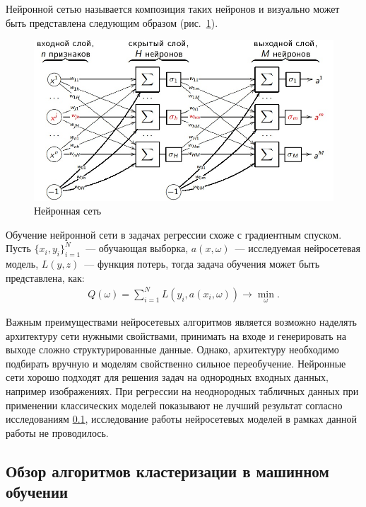 \documentclass[12pt,a4paper]{article} %
\begin{document}
Нейронной сетью называется композиция таких нейронов и визуально может быть представлена следующим образом (рис.~\ref{fig:neyron_net}).
\begin{figure}[h]
	
	\centering
	
	\includegraphics[width=0.8\linewidth]{neyron_net.jpg}
	
	\caption{Нейронная сеть}
	
	\label{fig:neyron_net}
	
\end{figure}

Обучение нейронной сети в задачах регрессии схоже с градиентным спуском. Пусть $\{x_i, y_i\}_{i=1}^{N}$~--- обучающая выборка, $a(x,\omega)$~--- исследуемая нейросетевая модель, $L(y,z)$~--- функция потерь, тогда задача обучения может быть представлена, как:
\begin{gather}\label{ney2}
	Q(\omega) = \sum\limits_{i=1}^{N}L(y_i, a(x_i, \omega)) \rightarrow \min_{\omega}.
\end{gather}

Важным преимуществами нейросетевых алгоритмов является возможно наделять архитектуру сети нужными свойствами, принимать на входе и генерировать на выходе сложно структурированные данные. Однако, архитектуру необходимо подбирать вручную и моделям свойственно сильное переобучение. Нейронные сети хорошо подходят для решения задач на однородных входных данных, например изображениях. При регрессии на неоднородных табличных данных при применении классических моделей показывают не лучший результат согласно исследованиям \ref{}, исследование работы нейросетевых моделей в рамках данной работы не проводилось.

\subsection{Обзор алгоритмов  кластеризации в машинном обучении}
\end{document}
